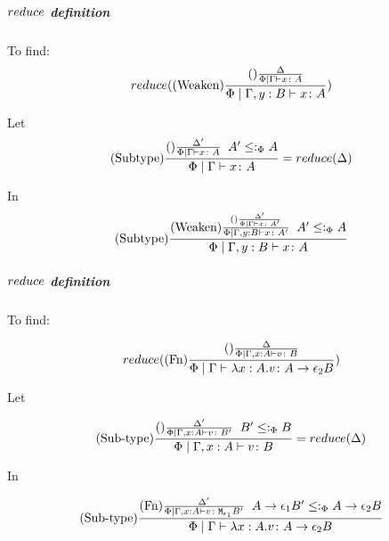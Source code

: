 {        
            \subparagraph{$reduce$ definition}
            To find:
            \begin{equation}
                reduce((\text{Weaken}) \frac{(\text{}) \frac{\Delta}{\Phi\mid\Gamma \vdash x \colon A}}{\Phi\mid\Gamma, y: B \vdash x \colon A})
            \end{equation}

            Let 
            \begin{equation}\label{WeakenDeltaReduction}
                (\text{Subtype}) \frac{(\text{}) \frac{\Delta'}{\Phi\mid\Gamma \vdash x \colon A}\;\; A'\leq:_\Phi A}{\Phi\mid\Gamma \vdash x \colon A} = reduce(\Delta)
            \end{equation}

            In 
            \begin{equation}
                (\text{Subtype}) \frac{
                (\text{Weaken}) \frac{
                    (\text{}) \frac{\Delta'}{\Phi\mid\Gamma \vdash x \colon A'}
                }{
                    \Phi\mid\Gamma, y: B \vdash x \colon A'
                }
                \;\;
                A' \leq:_\Phi A
                }{\Phi\mid\Gamma, y: B \vdash x \colon A}
            \end{equation}

            \subparagraph{$reduce$ definition}
                To find:
            
                \begin{equation}
                    reduce((\text{Fn}) \frac{
                        (\text{}) \frac{\Delta}{\Phi\mid\Gamma, x: A \vdash v \colon B}
                    }{\Phi\mid\Gamma \vdash \lambda x : A. v \colon A\rightarrow \epsilon_2{B}})
                \end{equation}

                Let 

                \begin{equation}
                    (\text{Sub-type}) \frac{
                        (\text{}) \frac{\Delta'}{\Phi\mid\Gamma, x: A \vdash v \colon B'}
                        \;\;
                        B' \leq:_\Phi B
                    }{
                        \Phi\mid\Gamma, x: A \vdash v \colon B
                    } = reduce(\Delta)
                \end{equation}

                In

                \begin{equation}
                    (\text{Sub-type}) \frac{
                        (\text{Fn}) \frac{
                            \Delta'
                        }{
                            \Phi\mid\Gamma, x: A \vdash v \colon \texttt{M}_{\epsilon_1}{B'}
                        }
                        \;\;
                        A\rightarrow \epsilon_1{B'}\leq:_\Phi A\rightarrow \epsilon_2{B}
                    }{
                        \Phi\mid\Gamma \vdash \lambda x : A. v \colon A\rightarrow \epsilon_2{B}
                    }
                \end{equation}

}

